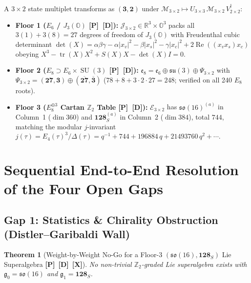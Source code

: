\documentclass[11pt,a4paper]{article}
\newcommand{\badgeP}{\textbf{\color{sqJade}[P]}}
\newcommand{\badgeD}{\textbf{\color{sqRose}[D]}}
\newcommand{\badgeX}{\textbf{\color{sqKilled}[X]}}
\newtheorem{theorem}{Theorem}[section]
\theoremstyle{definition}
\begin{document}
A $3\times 2$ state multiplet transforms as $(\mathbf{3},\mathbf{2})$ under $\mathcal{M}_{3\times 2} \mapsto U_{3\times 3}\,\mathcal{M}_{3\times 2}\, V_{2\times 2}^\dagger$:
\begin{itemize}
  \item \textbf{Floor 1 ($E_6$ / $J_3(\mathbb{O})$ \badgeP\ \badgeD):} $\mathcal{J}_{3\times 2} \in \mathbb{R}^3 \times \mathbb{O}^3$ packs all $3(1)+3(8)=27$ degrees of freedom of $J_3(\mathbb{O})$ with Freudenthal cubic determinant $\det(X) = \alpha\beta\gamma - \alpha|x_v|^2 - \beta|x_s|^2 - \gamma|x_c|^2 + 2\operatorname{Re}((x_v x_s)x_c)$ obeying $X^3 - \operatorname{tr}(X)X^2 + S(X)X - \det(X)I = 0$.
  \item \textbf{Floor 2 ($E_8 \supset E_6 \times \operatorname{SU}(3)$ \badgeP\ \badgeD):} $\mathfrak{e}_8 = \mathfrak{e}_6 \oplus \mathfrak{su}(3) \oplus \Psi_{3\times 2}$ with $\Psi_{3\times 2} = (\mathbf{27},\mathbf{3}) \oplus (\overline{\mathbf{27}},\overline{\mathbf{3}})$ ($78+8+3\cdot 2\cdot 27 = 248$; verified on all 240 $E_8$ roots).
  \item \textbf{Floor 3 ($E_8^{\oplus 3}$ Cartan $\mathbb{Z}_2$ Table \badgeP\ \badgeD):} $\mathcal{E}_{3\times 2}$ has $\mathfrak{so}(16)^{(a)}$ in Column~1 ($\dim 360$) and $\mathbf{128}_S^{(a)}$ in Column~2 ($\dim 384$), total $744$, matching the modular $j$-invariant $j(\tau) = E_4(\tau)^3/\Delta(\tau) = q^{-1} + 744 + 196884\,q + 21493760\,q^2 + \cdots$.
\end{itemize}

\section{Sequential End-to-End Resolution of the Four Open Gaps}

\subsection{Gap 1: Statistics \& Chirality Obstruction (Distler--Garibaldi Wall)}

\begin{theorem}[Weight-by-Weight No-Go for a Floor-3 $(\mathfrak{so}(16),\mathbf{128}_S)$ Lie Superalgebra \badgeP\ \badgeD\ \badgeX]
No non-trivial $\mathbb{Z}_2$-graded Lie superalgebra exists with $\mathfrak{g}_0 = \mathfrak{so}(16)$ and $\mathfrak{g}_1 = \mathbf{128}_S$.
\end{theorem}
\end{document}

